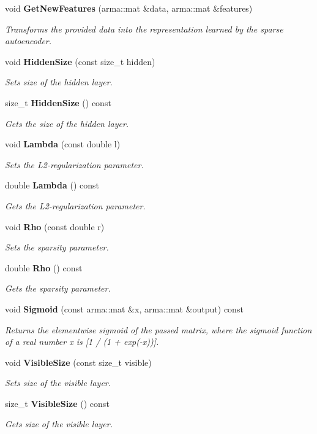 \begin{DoxyCompactItemize}
void \textbf{ Get\+New\+Features} (arma\+::mat \&data, arma\+::mat \&features)
\begin{DoxyCompactList}\small\item\em Transforms the provided data into the representation learned by the sparse autoencoder. \end{DoxyCompactList}\item 
void \textbf{ Hidden\+Size} (const size\+\_\+t hidden)
\begin{DoxyCompactList}\small\item\em Sets size of the hidden layer. \end{DoxyCompactList}\item 
size\+\_\+t \textbf{ Hidden\+Size} () const
\begin{DoxyCompactList}\small\item\em Gets the size of the hidden layer. \end{DoxyCompactList}\item 
void \textbf{ Lambda} (const double l)
\begin{DoxyCompactList}\small\item\em Sets the L2-\/regularization parameter. \end{DoxyCompactList}\item 
double \textbf{ Lambda} () const
\begin{DoxyCompactList}\small\item\em Gets the L2-\/regularization parameter. \end{DoxyCompactList}\item 
void \textbf{ Rho} (const double r)
\begin{DoxyCompactList}\small\item\em Sets the sparsity parameter. \end{DoxyCompactList}\item 
double \textbf{ Rho} () const
\begin{DoxyCompactList}\small\item\em Gets the sparsity parameter. \end{DoxyCompactList}\item 
void \textbf{ Sigmoid} (const arma\+::mat \&x, arma\+::mat \&output) const
\begin{DoxyCompactList}\small\item\em Returns the elementwise sigmoid of the passed matrix, where the sigmoid function of a real number \textquotesingle{}x\textquotesingle{} is [1 / (1 + exp(-\/x))]. \end{DoxyCompactList}\item 
void \textbf{ Visible\+Size} (const size\+\_\+t visible)
\begin{DoxyCompactList}\small\item\em Sets size of the visible layer. \end{DoxyCompactList}\item 
size\+\_\+t \textbf{ Visible\+Size} () const
\begin{DoxyCompactList}\small\item\em Gets size of the visible layer. \end{DoxyCompactList}\end{DoxyCompactItemize}


